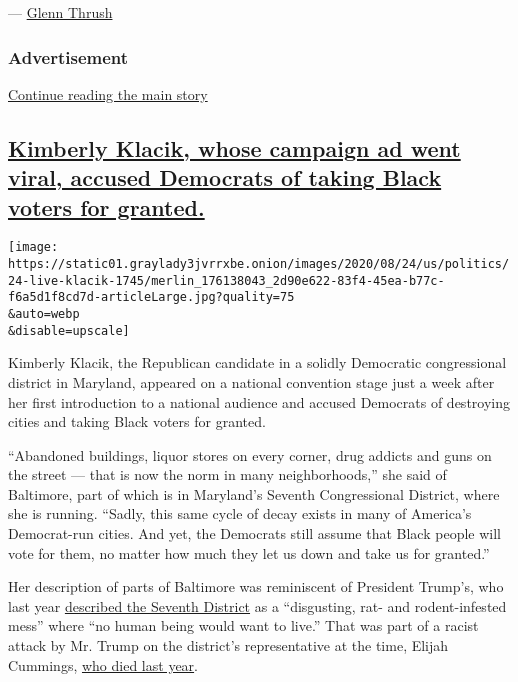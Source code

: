 --- \href{https://www.nytimes3xbfgragh.onion/by/glenn-thrush}{Glenn
Thrush}

\hypertarget{advertisement-5}{%
\subsubsection{Advertisement}\label{advertisement-5}}

\protect\hyperlink{after-dfp-ad-mid6}{Continue reading the main story}

\hypertarget{kimberly-klacik-whose-campaign-ad-went-viral-accused-democrats-of-taking-black-voters-for-granted}{%
\subsection{\texorpdfstring{\protect\hyperlink{kimberly-klacik-whose-campaign-ad-went-viral-accused-democrats-of-taking-black-voters-for-granted}{Kimberly
Klacik, whose campaign ad went viral, accused Democrats of taking Black
voters for
granted.}}{Kimberly Klacik, whose campaign ad went viral, accused Democrats of taking Black voters for granted.}}\label{kimberly-klacik-whose-campaign-ad-went-viral-accused-democrats-of-taking-black-voters-for-granted}}

\texttt{[image: https://static01.graylady3jvrrxbe.onion/images/2020/08/24/us/politics/24-live-klacik-1745/merlin\_176138043\_2d90e622-83f4-45ea-b77c-f6a5d1f8cd7d-articleLarge.jpg?quality=75\\\&auto=webp\\\&disable=upscale]}

Kimberly Klacik, the Republican candidate in a solidly Democratic
congressional district in Maryland, appeared on a national convention
stage just a week after her first introduction to a national audience
and accused Democrats of destroying cities and taking Black voters for
granted.

``Abandoned buildings, liquor stores on every corner, drug addicts and
guns on the street --- that is now the norm in many neighborhoods,'' she
said of Baltimore, part of which is in Maryland's Seventh Congressional
District, where she is running. ``Sadly, this same cycle of decay exists
in many of America's Democrat-run cities. And yet, the Democrats still
assume that Black people will vote for them, no matter how much they let
us down and take us for granted.''

Her description of parts of Baltimore was reminiscent of President
Trump's, who last year
\href{https://www.nytimes3xbfgragh.onion/2019/07/27/us/politics/trump-elijah-cummings.html}{described
the Seventh District} as a ``disgusting, rat- and rodent-infested mess''
where ``no human being would want to live.'' That was part of a racist
attack by Mr. Trump on the district's representative at the time, Elijah
Cummings,
\href{https://www.nytimes3xbfgragh.onion/2019/10/17/us/politics/elijah-cummings-death-illness.html}{who
died last year}.

